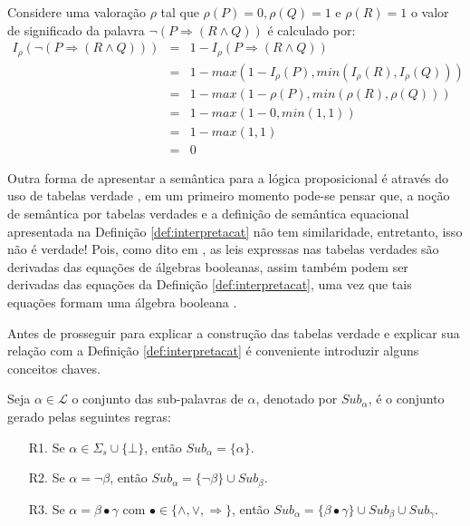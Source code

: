 \begin{exemplo}
  Considere uma valoração $\rho$ tal que $\rho(P) = 0, \rho(Q) = 1$ e $\rho(R) = 1$ o valor de significado da palavra $\neg(P \Rightarrow (R \land Q))$ é calculado por:
  \begin{eqnarray*}\label{eq:ExemploValoracaoA}
    I_\rho(\neg(P \Rightarrow (R \land Q))) & = & 1 - I_\rho(P \Rightarrow (R \land Q))\\
    & = & 1 - max(1 - I_\rho(P), min(I_\rho(R), I_\rho(Q)))\\
    & = & 1 - max(1 - \rho(P), min(\rho(R), \rho(Q)))\\
    & = & 1 - max(1 - 0, min(1, 1))\\
    & = & 1 - max(1, 1)\\
    & = & 0
  \end{eqnarray*}
\end{exemplo}

Outra forma de apresentar a semântica para a lógica proposicional é através do uso de tabelas verdade \cite{judith2021}, em um primeiro momento pode-se pensar que, a noção de semântica por tabelas verdades e a definição de semântica equacional apresentada na Definição \ref{def:interpretacat} não tem similaridade, entretanto, isso não é verdade! Pois, como dito em \cite{joaoPavao2014}, as leis expressas nas tabelas verdades são derivadas das equações de álgebras booleanas, assim também podem ser derivadas das equações da Definição \ref{def:interpretacat}, uma vez que tais equações formam uma álgebra booleana \cite{carmo2013}.

Antes de prosseguir para explicar a construção das tabelas verdade e explicar sua relação com a Definição \ref{def:interpretacat} é conveniente introduzir alguns conceitos chaves.

\begin{definicao}
  Seja $\alpha \in \mathcal{L}$ o conjunto das sub-palavras de $\alpha$, denotado por $Sub_{\alpha}$, é o conjunto gerado pelas seguintes regras:
  \begin{itemize}
       \item[R1.] Se $\alpha \in \Sigma_s \cup \{\bot\}$, então $Sub_\alpha = \{\alpha\}$.
       \item[R2.] Se $\alpha = \neg \beta$, então $Sub_\alpha = \{\neg \beta\} \cup Sub_\beta$.
       \item[R3.] Se $\alpha = \beta \bullet \gamma$  com $\bullet \in \{\land, \lor, \Rightarrow\}$, então $Sub_\alpha = \{\beta \bullet \gamma\} \cup Sub_\beta \cup Sub_\gamma$.
  \end{itemize}
\end{definicao}

